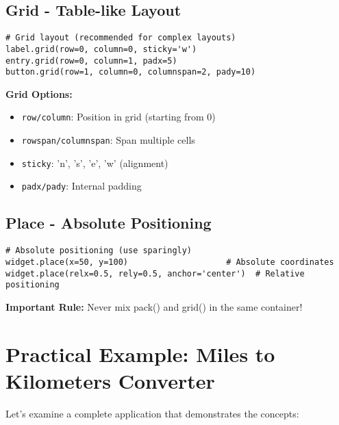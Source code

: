 \documentclass[12pt,a4paper]{article}
\begin{document}
\subsection{Grid - Table-like Layout}

\begin{tcolorbox}[colback=cyan!5!white,colframe=cyan!75!black,title=Grid Layout Manager]
\begin{lstlisting}
# Grid layout (recommended for complex layouts)
label.grid(row=0, column=0, sticky='w')
entry.grid(row=0, column=1, padx=5)
button.grid(row=1, column=0, columnspan=2, pady=10)
\end{lstlisting}
\end{tcolorbox}

\textbf{Grid Options:}
\begin{itemize}
    \item \texttt{row/column}: Position in grid (starting from 0)
    \item \texttt{rowspan/columnspan}: Span multiple cells
    \item \texttt{sticky}: 'n', 's', 'e', 'w' (alignment)
    \item \texttt{padx/pady}: Internal padding
\end{itemize}

\subsection{Place - Absolute Positioning}

\begin{lstlisting}
# Absolute positioning (use sparingly)
widget.place(x=50, y=100)                    # Absolute coordinates
widget.place(relx=0.5, rely=0.5, anchor='center')  # Relative positioning
\end{lstlisting}

\textbf{Important Rule:} Never mix pack() and grid() in the same container!

\section{Practical Example: Miles to Kilometers Converter}

Let's examine a complete application that demonstrates the concepts:
\end{document}
